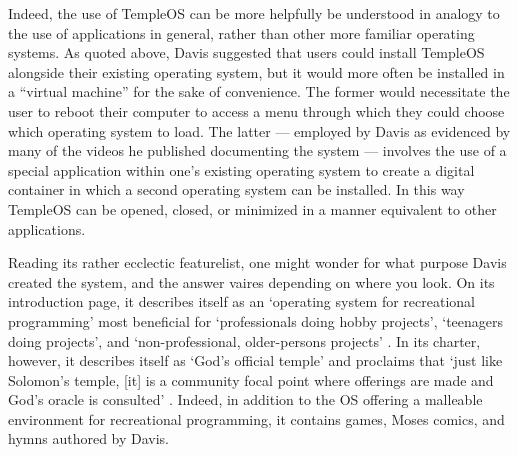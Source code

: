 \documentclass[Draft.tex]{subfiles}
\begin{document}

Indeed, the use of TempleOS can be more helpfully be understood in
analogy to the use of applications in general, rather than other
more familiar operating systems.
As quoted above, Davis suggested that users could install TempleOS
alongside their existing operating system, but it would more often
be installed in a ``virtual machine'' for the sake of convenience.
The former would necessitate the user to reboot their computer
to access a menu through which they could choose which operating system to
load.
The latter --- employed by Davis as evidenced by many of the
videos he published documenting the system --- involves the use of a special
application within one's existing operating system to create a digital container
in which a second operating system can be installed.
In this way TempleOS can be opened, closed, or minimized in a manner
equivalent to other applications.

Reading its rather ecclectic featurelist, one might wonder for what purpose
Davis created the system, and the answer vaires depending on where you look.
On its introduction page, it describes itself as
an `operating system for recreational programming' most beneficial for
`professionals doing hobby projects', `teenagers doing projects',
and `non-professional, older-persons projects'
\parencite{Welcome}.
In its charter, however, it describes itself as `God's official temple'
and proclaims that
`just like Solomon’s temple, [it] is a community focal point
where offerings are made and God’s oracle is consulted'
\parencite{Charter}.
Indeed, in addition to the OS offering
a malleable environment for recreational programming,
it contains games, Moses comics, and hymns authored by Davis.
\end{document}
